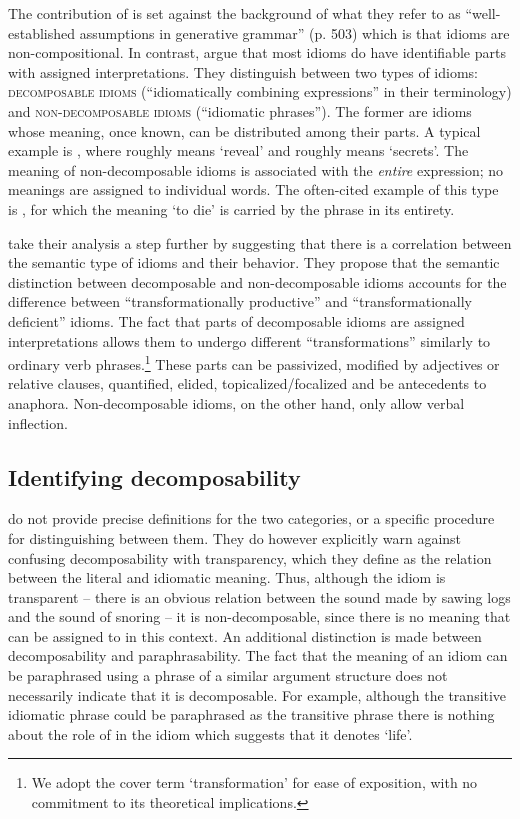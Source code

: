 \documentclass[output=paper]{langsci/langscibook}
\begin{document}
The contribution of \citet{nunberg94} is set against the background of what they refer to as ``well-established assumptions in generative grammar'' (p. 503) which is that idioms are non-compositional. In contrast, \citeauthor{Nunberg94} argue that most idioms do have identifiable parts with assigned interpretations. They distinguish between two types of
idioms: {\scshape decomposable idioms} (``idiomatically combining
expressions'' in their terminology) and {\scshape non-decomposable idioms}
(``idiomatic phrases''). The former are idioms whose meaning, once known, can be distributed among their parts. A typical example is , where  roughly means `reveal' and
 roughly means `secrets'. The meaning of
non-decomposable idioms is associated with the \emph{entire}
expression; no meanings are assigned to individual words. The
often-cited example of this type is , for
which the meaning `to die' is carried by the phrase in its entirety.


\citet{nunberg94} take their analysis a step further by suggesting that there is a correlation between the semantic type of idioms and their behavior. They propose that the semantic distinction between
decomposable and non-de\-com\-pos\-able idioms accounts for the difference
between ``transformationally productive'' and ``transformationally
deficient'' idioms. The fact that parts of decomposable idioms are
assigned interpretations allows them to undergo different
``transformations'' similarly to ordinary verb phrases.\footnote{We adopt the cover term `transformation' for ease of exposition, with no commitment to its theoretical implications.} These parts
can be passivized, modified by adjectives or relative clauses,
quantified, elided, topicalized/focalized and be antecedents to
anaphora. Non-decomposable idioms, on the other hand,
only allow verbal inflection.



\subsection{Identifying decomposability}


\citet{nunberg94} do not provide precise definitions for the two categories,
or a specific procedure for distinguishing between them. They do however explicitly warn against confusing decomposability with transparency, which they define as the relation between the literal and idiomatic meaning. Thus, although the idiom  is transparent -- there is an obvious relation between the sound made by sawing logs and the sound of snoring -- it is non-decomposable, since there is no meaning that can be assigned to  in this context. An additional distinction is made between decomposability and paraphrasability. The fact that the meaning of an idiom can be paraphrased using a phrase of a similar argument structure does not necessarily indicate that it is decomposable. For example, although the transitive idiomatic phrase  could be paraphrased as the transitive phrase  there is nothing about the role of  in the idiom which suggests that it denotes `life'.
\end{document}
